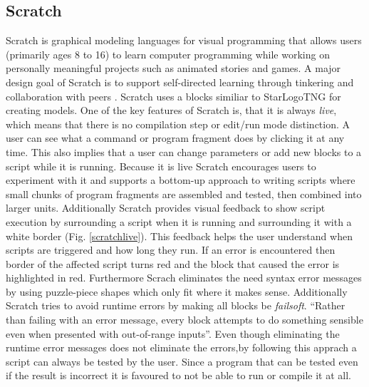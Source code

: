 \documentclass[runningheads,a4paper]{llncs}
\begin{document}
   \subsection{Scratch}
  Scratch is graphical modeling languages for visual programming that allows users (primarily ages 8 to 16) to learn
  computer programming while working on personally meaningful projects such as animated stories and games. 
  A major design goal of Scratch is to support self-directed learning through tinkering and collaboration with peers \cite{maloney2010scratch}. 
  Scratch uses a blocks similiar to StarLogoTNG for creating models. One of the key features of Scratch is, that it is always \emph{live},
  which means that there is no compilation step or edit/run mode distinction. A user can see what a command or program fragment does by clicking 
  it at any time. This also implies that a user can change parameters or add new blocks to a script while it is running.
  Because it is live Scratch encourages users to experiment with it and supports
  a bottom-up approach to writing scripts where small chunks of program fragments are assembled and tested, then combined into larger units.
  Additionally Scratch provides visual feedback to show script execution by surrounding a script when it is 
  running and surrounding it with a white border (Fig. \ref{scratchlive}). This feedback
  helps the user understand when scripts are triggered and how long they run. If an error is encountered then border of the 
  affected script turns red and the block that caused the error is highlighted in red. 
  Furthermore Scrach eliminates the need syntax error messages by using 
  puzzle-piece shapes which only fit where it makes sense. Additionally Scratch tries to avoid runtime errors by making all blocks be
  \textit{failsoft}. ``Rather than failing with an error message, every block attempts to do something sensible even when presented with out-of-range inputs''\cite{maloney2010scratch}.
  Even though eliminating the runtime error messages does not eliminate the errors,by following this apprach a script can always be tested by the user.
  Since a program that can be tested even if the result is incorrect it is favoured to not be able to run or compile it at all.
\end{document}
